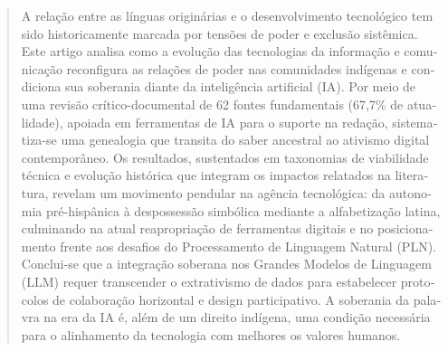 \documentclass[spanish]{textolivre}
\begin{document}
\begin{polyabstract}
\begin{portuguese}
\begin{abstract}
A relação entre as línguas originárias e o desenvolvimento tecnológico tem sido historicamente marcada por tensões de poder e exclusão sistêmica. Este artigo analisa como a evolução das tecnologias da informação e comunicação reconfigura as relações de poder nas comunidades indígenas e condiciona sua soberania diante da inteligência artificial (IA). Por meio de uma revisão crítico-documental de 62 fontes fundamentais (67,7\% de atualidade), apoiada em ferramentas de IA para o suporte na redação, sistematiza-se uma genealogia que transita do saber ancestral ao ativismo digital contemporâneo. Os resultados, sustentados em taxonomias de viabilidade técnica e evolução histórica que integram os impactos relatados na literatura, revelam um movimento pendular na agência tecnológica: da autonomia pré-hispânica à despossessão simbólica mediante a alfabetização latina, culminando na atual reapropriação de ferramentas digitais e no posicionamento frente aos desafios do Processamento de Linguagem Natural (PLN). Conclui-se que a integração soberana nos Grandes Modelos de Linguagem (LLM) requer transcender o extrativismo de dados para estabelecer protocolos de colaboração horizontal e design participativo. A soberania da palavra na era da IA é, além de um direito indígena, uma condição necessária para o alinhamento da tecnologia com melhores os valores humanos.

\end{abstract}
\end{portuguese}



\end{polyabstract}
\end{document}
